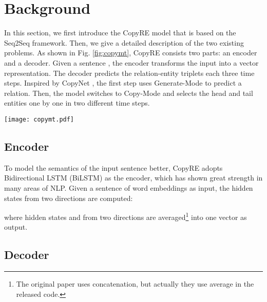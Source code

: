 \documentclass[letterpaper]{article} \usepackage{aaai20}  \usepackage{times}  \usepackage{helvet} \usepackage{courier}  \usepackage[hyphens]{url}  \usepackage{graphicx}
\begin{document}
  


  


  
  
  \section{Background}
  \label{background}    
      
      In this section, we first introduce the CopyRE model that is based on the Seq2Seq framework. 
      Then, we give a detailed description of the two existing problems.
      As shown in Fig. \ref{fig:copymt}, CopyRE consists two parts: an encoder and a decoder.
      Given a sentence , the encoder transforms the input  into a vector representation. 
      The decoder predicts the relation-entity triplets  each three time steps. 
      Inspired by CopyNet \cite{CopyNet}, the first step uses Generate-Mode to predict a relation. 
      Then, the model switches to Copy-Mode and selects the head and tail entities one by one in two different time steps.




      \begin{figure*}[t]
          \centering
          \texttt{[image: copymt.pdf]}
          \caption{The overview of CopyMTL model for joint extraction of relation and entity. The CopyRE model does not contain the CopyMTL-Tagging part, i.e., the sequence-labeling part in the figure.}
          \label{fig:copymt}
      \end{figure*}
      
      \subsection{Encoder}
      
      To model the semantics of the input sentence better, CopyRE adopts Bidirectional LSTM (BiLSTM) \cite{bilstm} as the encoder, which has shown great strength in many areas of NLP. Given a sentence of word embeddings  as input, the hidden states from two directions are computed:
      

      

where hidden states  and  from two directions are averaged\footnote{The original paper uses concatenation, but actually they use average in the released code.} into one vector  as output.
  
      
      \subsection{Decoder}
      \label{copyre_decoder}
      
\end{document}
